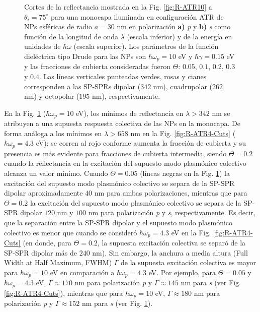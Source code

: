 \begin{figure}[h!]
	\caption{Cortes de la reflectancia mostrada en la Fig. \ref{fig:R-ATR10} a $\theta_i = 75^\circ$ para una monocapa iluminada en configuración ATR de NPs esféricas de radio $a=30$ nm en polarización \textbf{a)} \emph{p} y \textbf{b)} \emph{s} como función de la longitud de onda $\lambda$ (escala inferior) y de la energía en unidades de $\hbar\omega$ (escala superior). Los parámetros de la función dieléctrica tipo Drude para las NPs son $\hbar\omega_p = 10$ eV y $\hbar\gamma = 0.15$ eV y las fracciones de cubierta consideradas fueron $\Theta$: $0. 05$, $0. 1$, $0. 2$, $0. 3$ y $0. 4$. Las líneas verticales punteadas verdes, rosas y cianes corresponden a las SP-SPRs dipolar ($342$ nm), cuadrupolar ($262$ nm) y octopolar ($195$ nm), respectivamente.  }\label{fig:R-ATR10-Cuts}
	\end{figure}	

En la Fig. \ref{fig:R-ATR10-Cuts} ($\hbar\omega_p=10$ eV), los mínimos de reflectancia en $\lambda > 342$ nm se atribuyen a una supuesta respuesta colectiva de las NPs en la monocapa. De forma análoga a los mínimos en $\lambda>658$ nm en la Fig. \ref{fig:R-ATR4-Cuts} ($\hbar\omega_p = 4.3$ eV): se corren al rojo conforme aumenta la fracción de cubierta y su presencia es más evidente para fracciones de cubierta intermedia, siendo  $\Theta=0.2$ cuando la reflectancia en la excitación del supuesto modo plasmónico colectivo alcanza un valor mínimo. Cuando $\Theta = 0.05$ (líneas negras en la Fig. \ref{fig:R-ATR10-Cuts}) la excitación del supuesto modo plasmónico colectivo se separa de la SP-SPR dipolar  aproximadamente $40$ nm para ambas polarizaciones, mientras que para $\Theta = 0.2$ la excitación del supuesto modo plasmónico colectivo se separa de la SP-SPR dipolar  $120$ nm y $100$ nm para polarización \emph{p} y \emph{s}, respectivamente. Es decir, que la separación entre la SP-SPR dipolar y el supuesto modo plasmónico colectivo es menor que cuando se consideró $\hbar\omega_p = 4.3$ eV en la Fig. \ref{fig:R-ATR4-Cuts} (en donde, para $\Theta=0.2$, la supuesta excitación colectiva se separó de la SP-SPR dipolar más de $240$ nm). Sin embargo, la anchura a media altura (Full Width at Half Maximum, FWHM) $\Gamma$ de la supuesta excitación colectiva es mayor para $\hbar\omega_p=10$ eV en comparación a $\hbar\omega_p=4.3$ eV. Por ejemplo, para $\Theta = 0.05$ y $\hbar\omega_p = 4.3$ eV,  $\Gamma\approx 170$ nm para polarización \emph{p} y  $\Gamma\approx 145$ nm para  \emph{s} (ver Fig. \ref{fig:R-ATR4-Cuts}), mientras que para  $\hbar\omega_p = 10$ eV,  $\Gamma\approx 180$ nm para polarización \emph{p} y  $\Gamma\approx 152$ nm para  \emph{s} (ver Fig. \ref{fig:R-ATR10-Cuts}).

